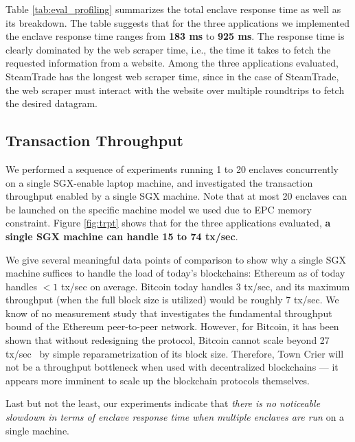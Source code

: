 Table \ref{tab:eval_profiling} summarizes the total enclave response time as
well as its breakdown.  The table suggests that for the three applications we
implemented the enclave response time ranges from {\bf 183 ms} to {\bf 925 ms}.
The response time is clearly dominated by the web scraper time, i.e., the time
it takes to fetch the requested information from a website.  Among the three
applications evaluated, {\sf SteamTrade} has the longest web scraper time, since
in the case of {\sf SteamTrade}, the web scraper must interact with the website
over multiple roundtrips to fetch the desired datagram.

\subsection{Transaction Throughput}
We performed a sequence of experiments running 1 to 20 enclaves 
concurrently
on a single SGX-enable laptop
machine, and investigated the transaction throughput 
enabled by a single SGX machine. 
Note that at most 20 \tc enclaves can be launched
on the specific machine model we used due to EPC memory
constraint.
Figure \ref{fig:trpt}
shows that for the three applications evaluated,
{\bf a single SGX machine can handle
15 to 74
tx/sec}.

We give several meaningful data points of comparison to show
why a single SGX machine suffices to handle the load of
today's blockchains: 
Ethereum as of today handles 
$< 1$ tx/sec on average. 
Bitcoin today handles
3 tx/sec, and 
its maximum throughput (when the full block size is utilized)
would be roughly 7 tx/sec.
We know of no measurement study that 
investigates the fundamental 
throughput bound of the Ethereum  peer-to-peer network.
However, for Bitcoin, it has been shown that without
redesigning the protocol, 
Bitcoin cannot scale beyond  
27 tx/sec~\cite{blockchainscaling}
by simple reparametrization of its block size.
Therefore, Town Crier will not be a throughput 
bottleneck when used 
with decentralized blockchains --- it appears 
more imminent to scale up 
the blockchain protocols themselves.

Last but not the least, our experiments indicate
that {\it there is no noticeable slowdown in terms of enclave
response time when multiple enclaves are run} on a single machine.

